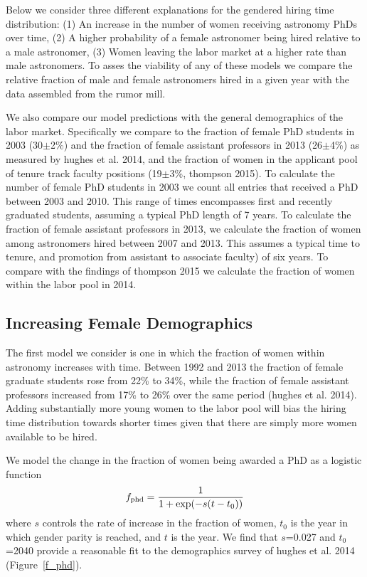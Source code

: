 \documentclass[modern]{aastex62}
\begin{document}
Below we consider three different explanations for the gendered hiring time distribution: (1) An increase in the number of women receiving astronomy PhDs over time, (2) A higher probability of a female astronomer being hired relative to a male astronomer, (3) Women leaving the labor market at a higher rate than male astronomers. To asses the viability of any of these models we compare the relative fraction of male and female astronomers hired in a given year with the data assembled from the rumor mill. 

We also compare our model predictions with the general demographics of the labor market. Specifically we compare to the fraction of female PhD students in 2003 (30$\pm$2\%) and the fraction of female assistant professors in 2013 (26$\pm$4\%) as measured by hughes et al. 2014, and the fraction of women in the applicant pool of tenure track faculty positions (19$\pm$3\%, thompson 2015). To calculate the number of female PhD students in 2003 we count all entries that received a PhD between 2003 and 2010. This range of times encompasses first and recently graduated students, assuming a typical PhD length of 7 years. To calculate the fraction of female assistant professors in 2013, we calculate the fraction of women among astronomers hired between 2007 and 2013. This assumes a typical time to tenure, and promotion from assistant to associate faculty) of six years. To compare with the findings of thompson 2015 we calculate the fraction of women within the labor pool in 2014. 

\subsection{Increasing Female Demographics}
The first model we consider is one in which the fraction of women within astronomy increases with time. Between 1992 and 2013 the fraction of female graduate students rose from 22\% to 34\%, while the fraction of female assistant professors increased from 17\% to 26\% over the same period (hughes et al. 2014). Adding substantially more young women to the labor pool will bias the hiring time distribution towards shorter times given that there are simply more women available to be hired.

We model the change in the fraction of women being awarded a PhD as a logistic function
\begin{equation}
f_{\rm phd} = \frac{1}{1+\exp (-s(t-t_0))}\\
\end{equation}
where $s$ controls the rate of increase in the fraction of women, $t_0$ is the year in which gender parity is reached, and $t$ is the year. We find that $s$=0.027 and $t_0$=2040 provide a reasonable fit to the demographics survey of hughes et al. 2014 (Figure~\ref{f_phd}).
\end{document}
